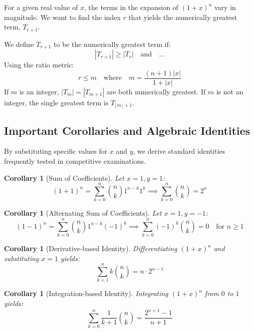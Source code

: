 \documentclass[10pt,journal,compsoc,onecolumn]{IEEEtran}
\newtheorem{corollary}[theorem]{Corollary}
\begin{document}
For a given real value of $x$, the terms in the expansion of $(1+x)^n$ vary in magnitude. We want to find the index $r$ that yields the numerically greatest term, $T_{r+1}$.

We define $T_{r+1}$ to be the numerically greatest term if:
\begin{equation}
|T_{r+1}| \ge |T_r| \quad \text{and} \quad \dots
\end{equation}
Using the ratio metric:
\begin{equation}
r \le m \quad \text{where} \quad m = \frac{(n+1)|x|}{1 + |x|}
\end{equation}
If $m$ is an integer, $|T_m| = |T_{m+1}|$ are both numerically greatest. If $m$ is not an integer, the single greatest term is $T_{\lfloor m \rfloor + 1}$.

\subsection{Important Corollaries and Algebraic Identities}

By substituting specific values for $x$ and $y$, we derive standard identities frequently tested in competitive examinations.

\begin{corollary}[Sum of Coefficients]
Let $x = 1, y = 1$:
\begin{equation}
(1 + 1)^n = \sum_{k=0}^{n} \binom{n}{k} 1^{n-k} 1^k \implies \sum_{k=0}^{n} \binom{n}{k} = 2^n
\end{equation}
\end{corollary}

\begin{corollary}[Alternating Sum of Coefficients]
Let $x = 1, y = -1$:
\begin{equation}
(1 - 1)^n = \sum_{k=0}^{n} \binom{n}{k} 1^{n-k} (-1)^k \implies \sum_{k=0}^{n} (-1)^k \binom{n}{k} = 0 \quad \text{for } n \ge 1
\end{equation}
\end{corollary}

\begin{corollary}[Derivative-based Identity]
Differentiating $(1+x)^n$ and substituting $x=1$ yields:
\begin{equation}
\sum_{k=1}^{n} k \binom{n}{k} = n \cdot 2^{n-1}
\end{equation}
\end{corollary}

\begin{corollary}[Integration-based Identity]
Integrating $(1+x)^n$ from $0$ to $1$ yields:
\begin{equation}
\sum_{k=0}^{n} \frac{1}{k+1} \binom{n}{k} = \frac{2^{n+1} - 1}{n+1}
\end{equation}
\end{corollary}
\end{document}
